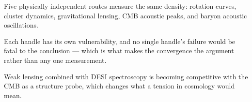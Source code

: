 \begin{keytakeaways}
\item Five physically independent routes measure the same density: rotation
curves, cluster dynamics, gravitational lensing, CMB acoustic peaks, and
baryon acoustic oscillations.
\item Each handle has its own vulnerability, and no single handle's failure
would be fatal to the conclusion --- which is what makes the convergence the
argument rather than any one measurement.
\item Weak lensing combined with DESI spectroscopy is becoming competitive
with the CMB as a structure probe, which changes what a tension in cosmology
would mean.
\end{keytakeaways}
